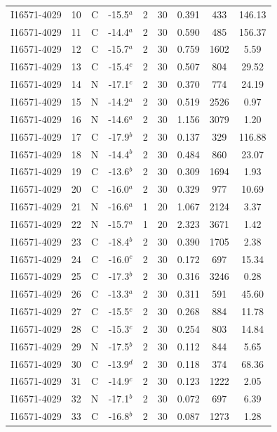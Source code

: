 \begin{table}
\begin{tabular}{ccccccccc}
I16571-4029 & 10 & C & -15.5$^{a}$ & 2 & 30 & 0.391 & 433 & 146.13 \\
I16571-4029 & 11 & C & -14.4$^{a}$ & 2 & 30 & 0.590 & 485 & 156.37 \\
I16571-4029 & 12 & C & -15.7$^{a}$ & 2 & 30 & 0.759 & 1602 & 5.59 \\
I16571-4029 & 13 & C & -15.4$^{c}$ & 2 & 30 & 0.507 & 804 & 29.52 \\
I16571-4029 & 14 & N & -17.1$^{c}$ & 2 & 30 & 0.370 & 774 & 24.19 \\
I16571-4029 & 15 & N & -14.2$^{a}$ & 2 & 30 & 0.519 & 2526 & 0.97 \\
I16571-4029 & 16 & N & -14.6$^{a}$ & 2 & 30 & 1.156 & 3079 & 1.20 \\
I16571-4029 & 17 & C & -17.9$^{b}$ & 2 & 30 & 0.137 & 329 & 116.88 \\
I16571-4029 & 18 & N & -14.4$^{b}$ & 2 & 30 & 0.484 & 860 & 23.07 \\
I16571-4029 & 19 & C & -13.6$^{b}$ & 2 & 30 & 0.309 & 1694 & 1.93 \\
I16571-4029 & 20 & C & -16.0$^{a}$ & 2 & 30 & 0.329 & 977 & 10.69 \\
I16571-4029 & 21 & N & -16.6$^{a}$ & 1 & 20 & 1.067 & 2124 & 3.37 \\
I16571-4029 & 22 & N & -15.7$^{a}$ & 1 & 20 & 2.323 & 3671 & 1.42 \\
I16571-4029 & 23 & C & -18.4$^{b}$ & 2 & 30 & 0.390 & 1705 & 2.38 \\
I16571-4029 & 24 & C & -16.0$^{c}$ & 2 & 30 & 0.172 & 697 & 15.34 \\
I16571-4029 & 25 & C & -17.3$^{b}$ & 2 & 30 & 0.316 & 3246 & 0.28 \\
I16571-4029 & 26 & C & -13.3$^{a}$ & 2 & 30 & 0.311 & 591 & 45.60 \\
I16571-4029 & 27 & C & -15.5$^{c}$ & 2 & 30 & 0.268 & 884 & 11.78 \\
I16571-4029 & 28 & C & -15.3$^{c}$ & 2 & 30 & 0.254 & 803 & 14.84 \\
I16571-4029 & 29 & N & -17.5$^{b}$ & 2 & 30 & 0.112 & 844 & 5.65 \\
I16571-4029 & 30 & C & -13.9$^{d}$ & 2 & 30 & 0.118 & 374 & 68.36 \\
I16571-4029 & 31 & C & -14.9$^{c}$ & 2 & 30 & 0.123 & 1222 & 2.05 \\
I16571-4029 & 32 & N & -17.1$^{b}$ & 2 & 30 & 0.072 & 697 & 6.39 \\
I16571-4029 & 33 & C & -16.8$^{b}$ & 2 & 30 & 0.087 & 1273 & 1.28 \\

\end{tabular}
\end{table}
